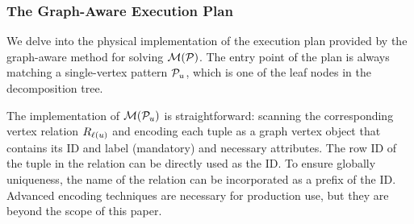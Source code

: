 
\subsubsection{The Graph-Aware Execution Plan}
\label{sec:join-matching-operator}
We delve into the physical implementation of the execution plan provided by the graph-aware method for solving $\mathcal{M}(\mathcal{P})$. The entry point of the plan is always matching a single-vertex pattern $\mathcal{P}_u$, which is one of the leaf nodes in the decomposition tree.

\enlargethispage{1em}

The implementation of $\mathcal{M}(\mathcal{P}_u)$ is straightforward: scanning the corresponding vertex relation ${R_{\mathcal{\ell}(u)}}$ and encoding each tuple as a graph vertex object that contains its ID and label (mandatory) and necessary attributes. The row ID of the tuple in the relation can be directly used as the ID. To ensure globally uniqueness, the name of the relation can be incorporated as a prefix of the ID. Advanced encoding techniques are necessary for production use, but they are beyond the scope of this paper.

